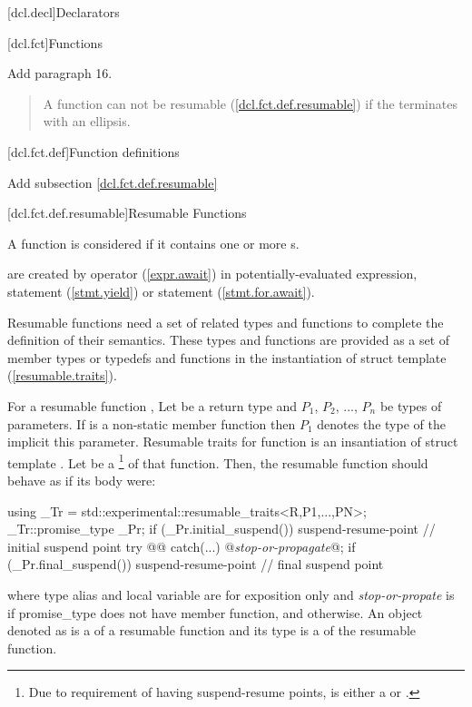 
[dcl.decl]{Declarators}

\setcounter{section}{3}
\setcounter{subsection}{4}
[dcl.fct]{Functions}%

Add paragraph 16.

\begin{quote}
\setcounter{Paras}{15}
\pnum
A function can not be resumable (\ref{dcl.fct.def.resumable}) if the  terminates with an ellipsis.
\end{quote}

\setcounter{section}{3}
[dcl.fct.def]{Function definitions}

Add subsection \ref{dcl.fct.def.resumable}

\setcounter{subsection}{3}
[dcl.fct.def.resumable]{Resumable Functions}


\pnum
A function is considered  if it contains
one or more s. 

\pnum
{} are created by  operator (\ref{expr.await}) in potentially-evaluated expression,
 statement (\ref{stmt.yield}) 
or  statement (\ref{stmt.for.await}).

\pnum
Resumable functions need a set of related types and functions
to complete the definition of their semantics.
These types and functions are provided as a set of member types or typedefs
and functions in the instantiation of struct template
 (\ref{resumable.traits}). 

\pnum
For a resumable function , Let  be a return type and $P_1$, $P_2$, ..., $P_n$
be types of parameters. If  is a non-static member function then $P_1$ denotes the type of the implicit this parameter. 
Resumable traits for function  is an insantiation of
struct template .
Let  be a 
\footnote{
Due to requirement of having suspend-resume points,
 is either a
 or 
.
}
of that function. Then, the resumable function 
should behave as if its body were:
\begin{codeblock}
  {
     using _Tr = std::experimental::resumable_traits<R,P1,...,PN>;
     _Tr::promise_type _Pr;
     if (_Pr.initial_suspend()) {
       suspend-resume-point // initial suspend point
     }
     try { @@ }
     catch(...) {
       @\textit{stop-or-propagate}@;
     }
     if (_Pr.final_suspend()) {
       suspend-resume-point // final suspend point
     }
  }
\end{codeblock}
where type alias  and local variable  are for
exposition only and
\textit{stop-or-propate} is  
if promise_type does not have  member function, and  otherwise. An object denoted as  is a  of
a resumable function and its type is a 
of the resumable function.

